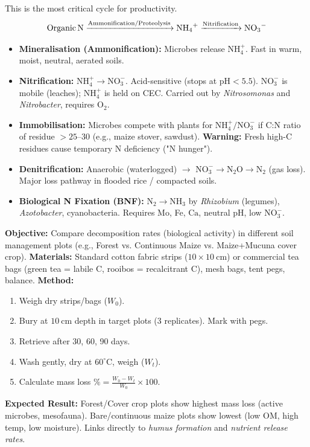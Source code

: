 \documentclass[11pt]{article}
\begin{document}
\begin{propriete}
This is the most critical cycle for productivity.
\[
\ce{Organic N ->[Ammonification/Proteolysis] NH4+ ->[Nitrification] NO3-}
\]
\begin{itemize}
    \item \textbf{Mineralisation (Ammonification):} Microbes release $\mathrm{NH_4^+}$. Fast in warm, moist, neutral, aerated soils.
    \item \textbf{Nitrification:} $\mathrm{NH_4^+ \to NO_3^-}$. Acid-sensitive (stops at $\mathrm{pH} < 5.5$). $\mathrm{NO_3^-}$ is mobile (leaches); $\mathrm{NH_4^+}$ is held on CEC. Carried out by \emph{Nitrosomonas} and \emph{Nitrobacter}, requires $\mathrm{O_2}$.
    \item \textbf{Immobilisation:} Microbes compete with plants for $\mathrm{NH_4^+}/\mathrm{NO_3^-}$ if C:N ratio of residue $> 25\text{--}30$ (e.g., maize stover, sawdust). \textbf{Warning:} Fresh high-C residues cause temporary N deficiency ("N hunger").
    \item \textbf{Denitrification:} Anaerobic (waterlogged) $\to$ $\mathrm{NO_3^- \to N_2O \to N_2}$ (gas loss). Major loss pathway in flooded rice / compacted soils.
    \item \textbf{Biological N Fixation (BNF):} $\mathrm{N_2 \to NH_3}$ by \emph{Rhizobium} (legumes), \emph{Azotobacter}, cyanobacteria. Requires Mo, Fe, $\mathrm{Ca}$, neutral pH, low $\mathrm{NO_3^-}$.
\end{itemize}
\end{propriete}

\begin{experience}
\textbf{Objective:} Compare decomposition rates (biological activity) in different soil management plots (e.g., Forest vs. Continuous Maize vs. Maize+Mucuna cover crop).
\textbf{Materials:} Standard cotton fabric strips ($10\times 10\ \mathrm{cm}$) or commercial tea bags (green tea = labile C, rooibos = recalcitrant C), mesh bags, tent pegs, balance.
\textbf{Method:}
\begin{enumerate}
    \item Weigh dry strips/bags ($W_0$).
    \item Bury at $10\ \mathrm{cm}$ depth in target plots (3 replicates). Mark with pegs.
    \item Retrieve after 30, 60, 90 days.
    \item Wash gently, dry at $60^\circ\mathrm{C}$, weigh ($W_t$).
    \item Calculate mass loss $\% = \frac{W_0 - W_t}{W_0} \times 100$.
\end{enumerate}
\textbf{Expected Result:} Forest/Cover crop plots show highest mass loss (active microbes, mesofauna). Bare/continuous maize plots show lowest (low OM, high temp, low moisture). Links directly to \emph{humus formation} and \emph{nutrient release rates}.
\end{experience}
\end{document}
